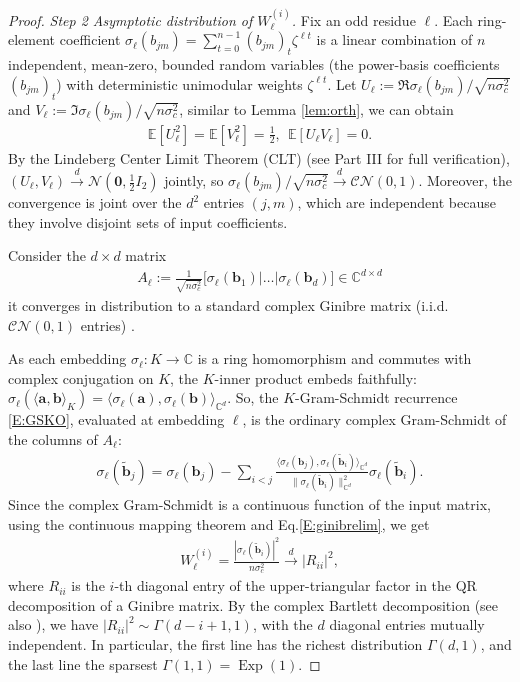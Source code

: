 \documentclass[11pt,a4paper]{article}
\theoremstyle{plain}
\theoremstyle{definition}
\theoremstyle{remark}
\newcommand{\C}{\mathbb{C}}
\newcommand{\E}{\mathbb{E}}
\begin{document}
\begin{proof}
\medskip
\textit{Step 2 Asymptotic distribution of $W^{(i)}_\ell$.} Fix an odd residue $\ell$. Each ring-element coefficient $\sigma_\ell(b_{jm})=\sum_{t=0}^{n-1}(b_{jm})_t\zeta^{\ell t}$ is a linear combination of $n$ independent, mean-zero, bounded random variables (the power-basis coefficients $(b_{jm})_t$) with deterministic unimodular weights $\zeta^{\ell t}$. Let $U_\ell:=\Re \sigma_\ell(b_{jm})/\sqrt{n\sigma_c^2}$ and $V_\ell:=\Im\sigma_\ell(b_{jm})/\sqrt{n\sigma_c^2}$, similar to Lemma \ref{lem:orth}, we can obtain
\begin{align}
  \E[U_\ell^2]=\E[V_\ell^2]=\tfrac{1}{2}, \ \ \E[U_\ell V_\ell]=0.
  \label{E:cltmoments}
\end{align}
By the Lindeberg Center Limit Theorem (CLT) (see Part III for full verification), $(U_\ell,V_\ell)\xrightarrow{d}\mathcal{N}(\mathbf{0},\tfrac{1}{2}I_2)$ jointly, so 
$\sigma_\ell(b_{jm})/\sqrt{n\sigma_c^2}\xrightarrow{d}\mathcal{CN}(0,1)$. Moreover, the convergence is joint over the $d^2$ entries $(j,m)$, which are independent because they involve disjoint sets of input coefficients.

Consider the $d\times d$ matrix
\begin{align}
  A_\ell:=\frac{1}{\sqrt{n\sigma_c^2}}
  \bigl[\sigma_\ell(\mathbf{b}_1) \big|\dots 
  \big|\sigma_\ell(\mathbf{b}_d)\bigr]\in\C^{d\times d}
  \label{E:ginibrelim}
\end{align}
it converges in distribution to a standard complex Ginibre matrix (i.i.d. $\mathcal{CN}(0,1)$ entries) \cite{Goodman63,Edelman89}.

As each embedding $\sigma_\ell: K\to\C$ is a ring homomorphism and commutes with complex conjugation on $K$, the $K$-inner product embeds faithfully: $\sigma_\ell(\langle\mathbf{a},\mathbf{b}\rangle_K)=\langle\sigma_\ell(\mathbf{a}), \sigma_\ell(\mathbf{b})\rangle_{\C^d}$. So, the $K$-Gram-Schmidt recurrence \eqref{E:GSKO}, evaluated at embedding $\ell$, is the ordinary complex Gram-Schmidt of the columns of $A_\ell$:
\begin{align}
  \sigma_\ell(\tilde{\mathbf{b}}_j)
    =\sigma_\ell(\mathbf{b}_j)-\sum_{i<j}\frac{\langle\sigma_\ell(\mathbf{b}_j),                    \sigma_\ell(\tilde{\mathbf{b}}_i)\rangle_{\C^d}}                  {\|\sigma_\ell(\tilde{\mathbf{b}}_i)\|_{\C^d}^2}
   \sigma_\ell(\tilde{\mathbf{b}}_i).
  \label{E:gsembed}
\end{align}
Since the complex Gram-Schmidt is a continuous function of the input matrix, using the continuous mapping theorem and Eq.\eqref{E:ginibrelim}, we get 
\begin{align}
W^{(i)}_\ell=\frac{|\sigma_\ell(\tilde{\mathbf{b}}_i)|^2}{n\sigma_c^2}
\xrightarrow{d}|R_{ii}|^2,
\label{E:Weg}
\end{align}
where $R_{ii}$ is the $i$-th diagonal entry of the upper-triangular factor in the QR decomposition of a Ginibre matrix. By the complex Bartlett decomposition \cite{Goodman63,Edelman89} (see also \cite{Muirhead82,Forrester10}), we have $|R_{ii}|^2\sim\Gamma(d-i+1,1)$, with the $d$ diagonal entries mutually independent. In particular, the first line has the richest distribution $\Gamma(d,1)$, and the last line the sparsest $\Gamma(1,1)=\operatorname{Exp}(1)$.


\end{proof}
\end{document}

